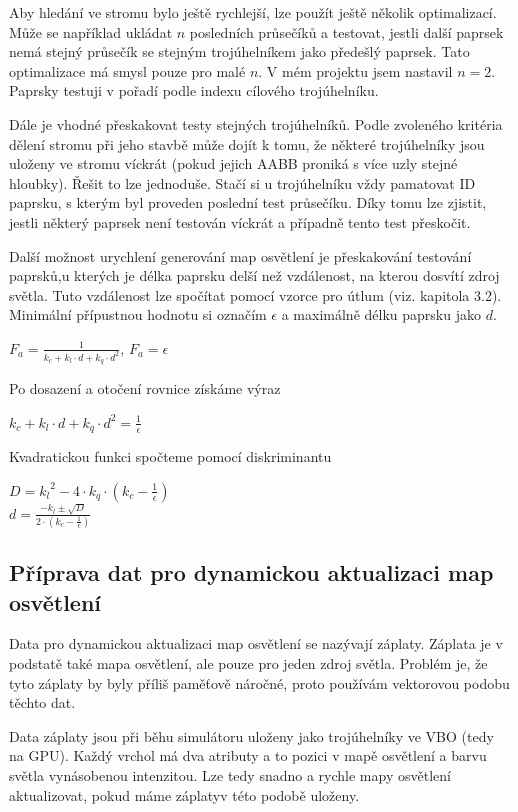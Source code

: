 \documentclass[11pt,twoside,a4paper]{book}
\begin{document}
Aby hledání ve stromu bylo ještě rychlejší, lze použít ještě několik optimalizací. Může se například ukládat $n$ posledních průsečíků a testovat, jestli další paprsek nemá stejný průsečík se stejným trojúhelníkem jako předešlý paprsek. Tato optimalizace má smysl pouze pro malé $n$. V mém projektu jsem nastavil $n = 2$. Paprsky testuji v pořadí podle indexu cílového trojúhelníku.

Dále je vhodné přeskakovat testy stejných trojúhelníků. Podle zvoleného kritéria dělení stromu při jeho stavbě může dojít k tomu, že některé trojúhelníky jsou uloženy ve stromu víckrát (pokud jejich AABB proniká s více uzly stejné hloubky). Řešit to lze jednoduše. Stačí si u trojúhelníku vždy pamatovat ID paprsku, s kterým byl proveden poslední test průsečíku. Díky tomu lze zjistit, jestli některý paprsek není testován víckrát a případně tento test přeskočit.

Další možnost urychlení generování map osvětlení je přeskakování testování paprsků,\linebreak u kterých je délka paprsku delší než vzdálenost, na kterou dosvítí zdroj světla. Tuto vzdálenost lze spočítat pomocí vzorce pro útlum (viz. kapitola 3.2). Minimální přípustnou hodnotu si označím $\epsilon$ a maximálně délku paprsku jako $d$.
\begin{center}
$F_a = \frac{1}{k_c + k_l \cdot d + k_q \cdot d^2}$, $F_a = \epsilon$
\end{center}
Po dosazení a otočení rovnice získáme výraz
\begin{center}
$k_c + k_l \cdot d + k_q \cdot d^2 = \frac{1}{\epsilon}$
\end{center}
Kvadratickou funkci spočteme pomocí diskriminantu
\begin{center}
$D = {k_l}^2 - 4 \cdot k_q \cdot (k_c - \frac{1}{\epsilon})$\\
$d = \frac{-k_l \pm \sqrt{D}}{2 \cdot (k_c - \frac{1}{\epsilon})}$
\end{center}


\subsection{Příprava dat pro dynamickou aktualizaci map osvětlení}
Data pro dynamickou aktualizaci map osvětlení se nazývají záplaty. Záplata je v podstatě také mapa osvětlení, ale pouze pro jeden zdroj světla. Problém je, že tyto záplaty by byly příliš paměťově náročné, proto používám vektorovou podobu těchto dat.

Data záplaty jsou při běhu simulátoru uloženy jako trojúhelníky ve VBO (tedy na GPU). Každý vrchol má dva atributy a to pozici v mapě osvětlení a barvu světla vynásobenou intenzitou. Lze tedy snadno a rychle mapy osvětlení aktualizovat, pokud máme záplaty\linebreak v této podobě uloženy.
\end{document}
